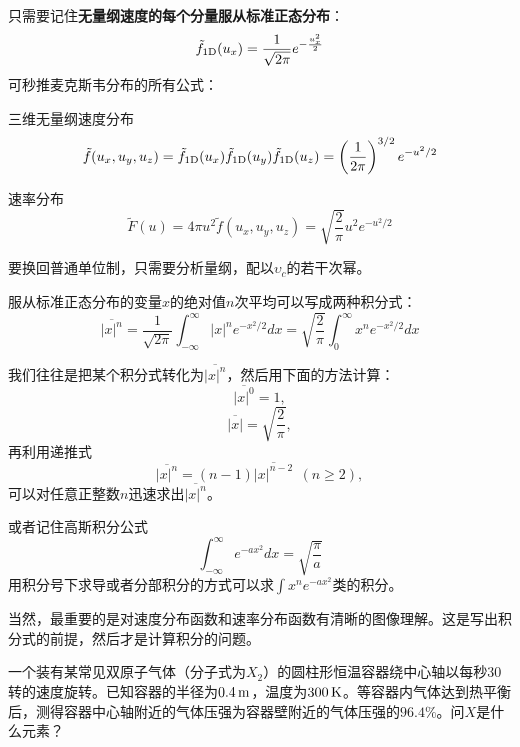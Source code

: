 \documentclass[CJK]{beamer}
\begin{document}
\setcounter{chap}{2}
\setcounter{problem}{0}

\begin{frame}
  \bch
  {\small
  只需要记住{\bf 无量纲速度的每个分量服从标准正态分布}：
  $$\tilde{f}_{\rm 1D}(u_x) = \frac{1}{\sqrt{2\pi}}e^{-\frac{u_x^2}{2}}$$
  可秒推麦克斯韦分布的所有公式：
  
  三维无量纲速度分布
  $$ \tilde{f}(u_x, u_y, u_z) = \tilde{f}_{\rm 1D}(u_x)\tilde{f}_{\rm 1D}(u_y)\tilde{f}_{\rm 1D}(u_z) =\left(\frac{1}{2\pi}\right)^{3/2}e^{-u^2/2}$$
  
  速率分布
  $$ \tilde{F}(u) = 4\pi u^2 \tilde{f}(u_x, u_y, u_z) = \sqrt{\frac{2}{\pi}}u^2e^{-u^2/2}$$

  要换回普通单位制，只需要分析量纲，配以$\upsilon_c$的若干次幂。}
  \ech
\end{frame}


\begin{frame}
  \bch
  {\small
  服从标准正态分布的变量$x$的绝对值$n$次平均可以写成两种积分式：
  $$\overline{|x|^n}=\frac{1}{\sqrt{2\pi}}\int_{-\infty}^\infty |x|^n e^{-x^2/2}dx = \sqrt{\frac{2}{\pi}}\int_0^\infty x^n e^{-x^2/2}dx $$

  我们往往是把某个积分式转化为$\overline{|x|^n}$，然后用下面的方法计算：
  $$\overline{|x|^0} = 1,$$
  $$\overline{|x|} = \sqrt{\frac{2}{\pi}},$$
  再利用递推式
  $$\overline{|x|^n} = (n-1) \overline{|x|^{n-2}}\ \  (n\ge 2),$$
  可以对任意正整数$n$迅速求出$\overline{|x|^n}$。
  }
  \ech
\end{frame}


\begin{frame}
  \bch
      {\small
        或者记住高斯积分公式
        $$\int_{-\infty}^{\infty} e^{-ax^2}dx = \sqrt{\frac{\pi}{a}}$$
        用积分号下求导或者分部积分的方式可以求$\int x^n e^{-ax^2}$类的积分。
  }
  \ech
\end{frame}

\begin{frame}
  \bch
      {\small
        当然，最重要的是对速度分布函数和速率分布函数有清晰的图像理解。这是写出积分式的前提，然后才是计算积分的问题。
  }
  \ech
\end{frame}

\begin{frame}
  \chtitle{\proid (\stwo)}
  \bch
  一个装有某常见双原子气体（分子式为$X_2$）的圆柱形恒温容器绕中心轴以每秒$30$转的速度旋转。已知容器的半径为$0.4\,\mathrm{m}$，温度为$300\,\mathrm{K}$。等容器内气体达到热平衡后，测得容器中心轴附近的气体压强为容器壁附近的气体压强的$96.4\%$。问$X$是什么元素？
  \ech
\end{frame}
\end{document}
